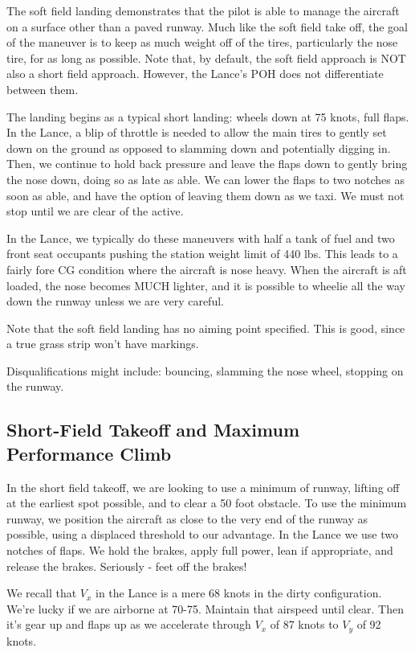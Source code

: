 The soft field landing demonstrates that the pilot is able to manage the aircraft on a surface other than a paved runway. Much like the soft field take off, the goal of the maneuver is to keep as much weight off of the tires, particularly the nose tire, for as long as possible. Note that, by default, the soft field approach is NOT also a short field approach. However, the Lance's POH does not differentiate between them.

The landing begins as a typical short landing: wheels down at 75 knots, full flaps. In the Lance, a blip of throttle is needed to allow the main tires to gently set down on the ground as opposed to slamming down and potentially digging in. Then, we continue to hold back pressure and leave the flaps down to gently bring the nose down, doing so as late as able. We can lower the flaps to two notches as soon as able, and have the option of leaving them down as we taxi. We must not stop until we are clear of the active.

In the Lance, we typically do these maneuvers with half a tank of fuel and two front seat occupants pushing the station weight limit of 440 lbs. This leads to a fairly fore CG condition where the aircraft is nose heavy. When the aircraft is aft loaded, the nose becomes MUCH lighter, and it is possible to wheelie all the way down the runway unless we are very careful.

Note that the soft field landing has no aiming point specified. This is good, since a true grass strip won't have markings.

Disqualifications might include: bouncing, slamming the nose wheel, stopping on the runway.

\subsection{Short-Field Takeoff and Maximum Performance Climb}

In the short field takeoff, we are looking to use a minimum of runway, lifting off at the earliest spot possible, and to clear a 50 foot obstacle. To use the minimum runway, we position the aircraft as close to the very end of the runway as possible, using a displaced threshold to our advantage. In the Lance we use two notches of flaps. We hold the brakes, apply full power, lean if appropriate, and release the brakes. Seriously - feet off the brakes!

We recall that $V_x$ in the Lance is a mere 68 knots in the dirty configuration. We're lucky if we are airborne at 70-75. Maintain that airspeed until clear. Then it's gear up and flaps up as we accelerate through $V_x$ of 87 knots to $V_y$ of 92 knots.

